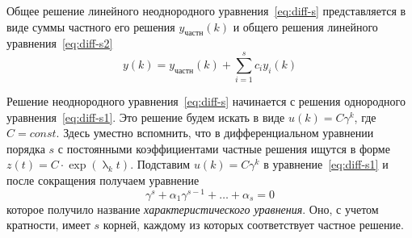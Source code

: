 \begin{theorem}
    Общее решение линейного неоднородного уравнения~\eqref{eq:diff-s} представляется в виде суммы частного его решения
    $\displaystyle y_{\textit{частн}}(k)$ и общего решения линейного уравнения~\eqref{eq:diff-s2}
    \begin{equation*}
        y(k) = y_{\textit{частн}}(k) + \sum_{i=1}^{s} c_i y_i (k)
    \end{equation*}
\end{theorem}
Решение неоднородного уравнения~\eqref{eq:diff-s} начинается с решения однородного уравнения~\eqref{eq:diff-s1}. Это
решение будем искать в виде $\displaystyle u(k) = C\gamma^k$, где $\displaystyle C = const$. Здесь уместно вспомнить, что в
дифференциальном уравнении порядка $s$ с постоянными коэффициентами частные решения ищутся в форме
$\displaystyle z(t) = C \cdot \exp(\uplambda_k t)$. Подставим $\displaystyle u(k) = C\gamma^k$ в уравнение~\eqref{eq:diff-s1} и
после сокращения получаем уравнение
\begin{equation}
    \gamma^s + \alpha_1 \gamma^{s-1} + \dots + \alpha_s = 0
\end{equation}
которое получило название \emph{характеристического уравнения}. Оно, с учетом кратности, имеет $s$ корней, каждому из
которых соответствует частное решение.
